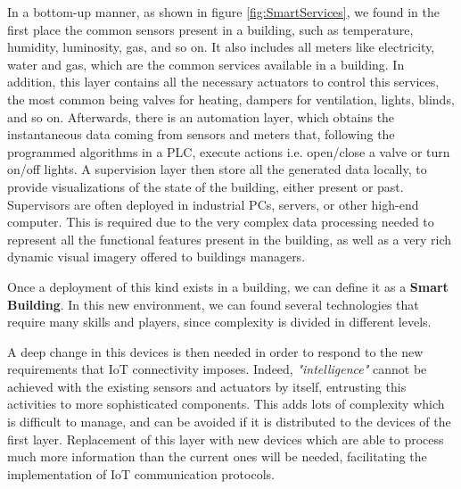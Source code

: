 
In a bottom-up manner, as shown in figure \ref{fig:SmartServices}, we found in the first place the common sensors present in a building, such as temperature, humidity, luminosity, gas, and so on. 
It also includes all meters like electricity, water and gas, which are the common services available in a building.
In addition, this layer contains all the necessary actuators to control this services, the most common being valves for heating, dampers for ventilation, lights, blinds, and so on.
Afterwards, there is an automation layer, which obtains the instantaneous data coming from sensors and meters that, following the programmed algorithms in a PLC, execute actions i.e. open/close a valve or turn on/off lights.
A supervision layer then store all the generated data locally, to provide visualizations of the state of the building, either present or past.
Supervisors are often deployed in industrial PCs, servers, or other high-end computer.
This is required due to the very complex data processing needed to represent all the functional features present in the building, as well as a very rich dynamic visual imagery offered to buildings managers.

Once a deployment of this kind exists in a building, we can define it as a \textbf{Smart Building}.
In this new environment, we can found several technologies that require many skills and players, since complexity is divided in different levels.

A deep change in this devices is then needed in order to respond to the new requirements that IoT connectivity imposes.
Indeed, \textit{"intelligence"} cannot be achieved with the existing sensors and actuators by itself, entrusting this activities to more sophisticated components.
This adds lots of complexity which is difficult to manage, and can be avoided if it is distributed to the devices of the first layer.
Replacement of this layer with new devices which are able to process much more information than the current ones will be needed, facilitating the implementation of IoT communication protocols.

